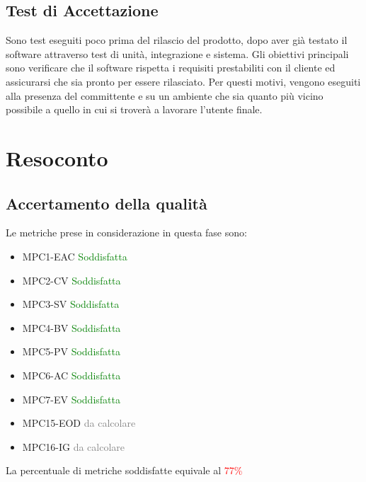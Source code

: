 \subsection{Test di Accettazione}
Sono test eseguiti poco prima del rilascio del prodotto, dopo aver già testato il software attraverso test di unità, integrazione e sistema. Gli obiettivi principali sono verificare che il software rispetta i requisiti prestabiliti con il cliente ed assicurarsi che sia pronto per essere rilasciato. Per questi motivi, vengono eseguiti alla presenza del committente e su un ambiente che sia quanto più vicino possibile a quello in cui si troverà a lavorare l'utente finale.

\newpage
\section{Resoconto}\label{resconto}

\subsection{Accertamento della qualità}\label{accertamento delle qualitá}
Le metriche prese in considerazione in questa fase sono:
\begin{itemize}
    \item MPC1-EAC \textcolor{green}{Soddisfatta} 
    \item MPC2-CV \textcolor{green}{Soddisfatta} 
    \item MPC3-SV \textcolor{green}{Soddisfatta} 
    \item MPC4-BV \textcolor{green}{Soddisfatta} 
    \item MPC5-PV \textcolor{green}{Soddisfatta} 
    \item MPC6-AC \textcolor{green}{Soddisfatta} 
    \item MPC7-EV \textcolor{green}{Soddisfatta} 
    \item MPC15-EOD \textcolor{gray}{da calcolare}
    \item MPC16-IG \textcolor{gray}{da calcolare}
\end{itemize}

La percentuale di metriche soddisfatte equivale al \textcolor{red}{77\%}

\newpage
